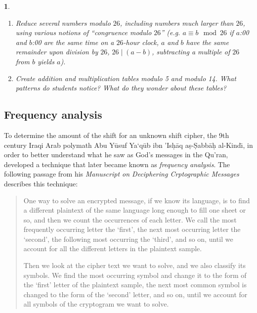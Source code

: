 \documentclass[11pt]{article}
\theoremstyle{plain}
\theoremstyle{remark}
\theoremstyle{definition}
\theoremstyle{definition}
\theoremstyle{definition}
\theoremstyle{plain}
\theoremstyle{plain}
\theoremstyle{plain}
\newtheorem{act}[thm]{\protect\activityname}
\theoremstyle{definition}
\providecommand{\activityname}{Activity}
\begin{document}
\begin{act}
\begin{enumerate}
	\item Reduce several numbers modulo $26$, including numbers much larger than $26$, using various notions of ``congruence modulo $26$'' (e.g. $a\equiv b\mod26$ if $a$:00 and $b$:00 are the same time on a $26$-hour clock, $a$ and $b$ have the same remainder upon division by $26$, $26\mid (a-b)$, subtracting a multiple of $26$ from $b$ yields $a$).

	\item Create addition and multiplication tables modulo 5 and modulo 14. What patterns do students notice? What do they wonder about these tables?		
\end{enumerate}
\end{act}


\subsection{Frequency analysis}

To determine the amount of the shift for an unknown shift cipher,
the 9th century Iraqi Arab polymath Abu Y\={u}suf Ya\textquoteleft q\={u}b
ibn 'Is\d{h}\={a}q a\d{s}-\d{S}abb\={a}\d{h} al-Kind\={\i}, in order
to better understand what he saw as God's messages in the Qu'ran,
developed a technique that later became known as \textit{frequency
analysis}. The following passage from his \emph{Manuscript on Deciphering
Crptographic Messages }describes this technique:
\begin{quotation}
One way to solve an encrypted message, if we know its language, is
to find a different plaintext of the same language long enough to
fill one sheet or so, and then we count the occurrences of each letter.
We call the most frequently occurring letter the \textquoteleft first\textquoteright ,
the next most occurring letter the \textquoteleft second\textquoteright ,
the following most occurring the \textquoteleft third\textquoteright ,
and so on, until we account for all the different letters in the plaintext
sample.

Then we look at the cipher text we want to solve, and we also classify
its symbols. We find the most occurring symbol and change it to the
form of the \textquoteleft first\textquoteright{} letter of the plaintext
sample, the next most common symbol is changed to the form of the
\textquoteleft second\textquoteright{} letter, and so on, until we
account for all symbols of the cryptogram we want to solve.
\end{quotation}
\end{document}
